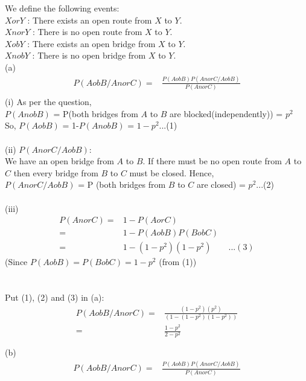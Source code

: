 \documentclass[12pt]{article}
\begin{document}
    \begin{solution}
        We define the following events:\\
        $XorY$ : There exists an open route from $X$ to $Y$.\\
        $XnorY$ : There is no open route from $X$ to $Y$.\\
        $XobY$ : There exists an open bridge from $X$ to $Y$.\\
        $XnobY$ : There is no open bridge from $X$ to $Y$.\\
        
        (a)
        \begin{align*}
            P(AobB/AnorC) = &\frac{P(AobB)P(AnorC/AobB)}{P(AnorC)}\\
        \end{align*}
        (i) As per the question,\\ $P(AnobB)$ = P(both bridges from $A$ to $B$ are blocked(independently)) = $p^2$\\
        So, $P(AobB)$ = 1-$P(AnobB)$ =  $1-p^2$\quad\quad...(1)\\\\
        (ii) $P(AnorC/AobB)$:\\
        We have an open bridge from $A$ to $B$. If there must be no open route from $A$ to $C$ then every bridge from $B$ to $C$ must be closed. Hence,\\
        $P(AnorC/AobB)$ = P (both bridges from $B$ to $C$ are closed) = $p^2$\quad\quad...(2)\\\\
        (iii)\begin{align*}
            P(AnorC) = &1 - P(AorC) \\= &1 - P(AobB)P(BobC)\\=& 1-(1-p^2)(1-p^2)
            \quad\quad...(3)
        \end{align*}
        (Since $P(AobB)=P(BobC)=1-p^2$ (from (1))\\\\\\
        Put (1), (2) and (3) in (a):
        \begin{align*}
            P(AobB/AnorC) = &\frac{(1-p^2)(p^2)}{(1-(1-p^2)(1-p^2))}\\
            = & \frac{1-p^2}{2-p^2}\\\\
        \end{align*}
        (b)
        \begin{align*}
            P(AobB/AnorC) = &\frac{P(AobB)P(AnorC/AobB)}{P(AnorC)}\\

\end{align*}
\end{solution}
\end{document}
